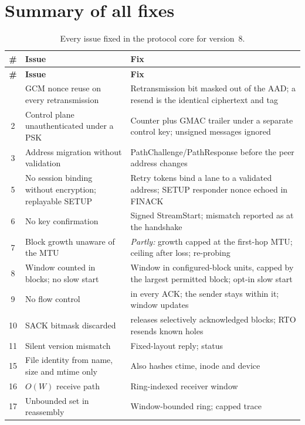 \section{Summary of all fixes}

\begingroup\small
\begin{xltabular}{\linewidth}{c>{\raggedright\arraybackslash}p{4.6cm}>{\raggedright\arraybackslash}X}
\caption{Every issue fixed in the protocol core for version~8.}\label{tab:fixes}\\
\toprule
\textbf{\#} & \textbf{Issue} & \textbf{Fix} \\
\midrule\endfirsthead
\toprule
\textbf{\#} & \textbf{Issue} & \textbf{Fix} \\
\midrule\endhead
\bottomrule{} & GCM nonce reuse on every retransmission & Retransmission bit masked out of the AAD; a resend is the identical ciphertext and tag \\
2 & Control plane unauthenticated under a PSK & Counter plus GMAC trailer under a separate control key; unsigned messages ignored \\
3 & Address migration without validation & PathChallenge/PathResponse before the peer address changes \\
5 & No session binding without encryption; replayable SETUP & Retry tokens bind a lane to a validated address; SETUP responder nonce echoed in FINACK \\
6 & No key confirmation & Signed StreamStart; mismatch reported as  at the handshake \\
7 & Block growth unaware of the MTU & \emph{Partly:} growth capped at the first-hop MTU; ceiling after loss; re-probing \\
8 & Window counted in blocks; no slow start & Window in configured-block units, capped by the largest permitted block; opt-in slow start \\
9 & No flow control &  in every ACK; the sender stays within it; window updates \\
10 & SACK bitmask discarded &  releases selectively acknowledged blocks; RTO resends known holes \\
11 & Silent version mismatch & Fixed-layout reply;  status \\
15 & File identity from name, size and mtime only & Also hashes ctime, inode and device \\
16 & $O(W)$ receive path & Ring-indexed receiver window \\
17 & Unbounded set in reassembly & Window-bounded ring; capped trace \\

\end{xltabular}
